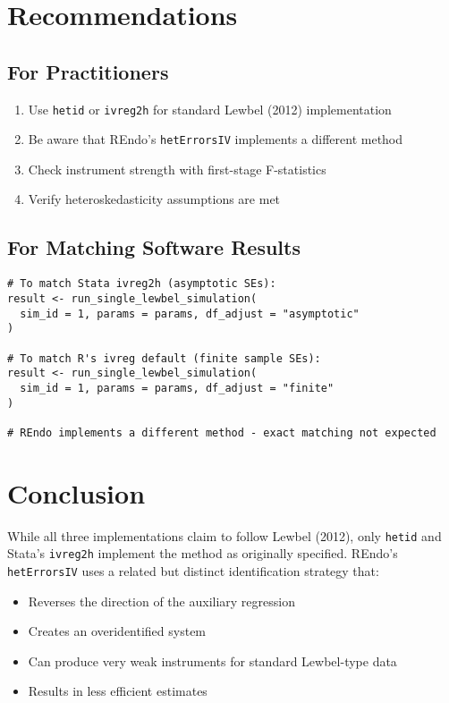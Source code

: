 \documentclass[12pt]{article}
\begin{document}
\section{Recommendations}

\subsection{For Practitioners}

\begin{enumerate}
\item Use \texttt{hetid} or \texttt{ivreg2h} for standard Lewbel (2012) implementation
\item Be aware that REndo's \texttt{hetErrorsIV} implements a different method
\item Check instrument strength with first-stage F-statistics
\item Verify heteroskedasticity assumptions are met
\end{enumerate}

\subsection{For Matching Software Results}

\begin{lstlisting}[caption={Matching different implementations}]
# To match Stata ivreg2h (asymptotic SEs):
result <- run_single_lewbel_simulation(
  sim_id = 1, params = params, df_adjust = "asymptotic"
)

# To match R's ivreg default (finite sample SEs):
result <- run_single_lewbel_simulation(
  sim_id = 1, params = params, df_adjust = "finite"
)

# REndo implements a different method - exact matching not expected
\end{lstlisting}

\section{Conclusion}

While all three implementations claim to follow Lewbel (2012), only \texttt{hetid} and Stata's \texttt{ivreg2h} implement the method as originally specified. REndo's \texttt{hetErrorsIV} uses a related but distinct identification strategy that:

\begin{itemize}
\item Reverses the direction of the auxiliary regression
\item Creates an overidentified system
\item Can produce very weak instruments for standard Lewbel-type data
\item Results in less efficient estimates
\end{itemize}
\end{document}
